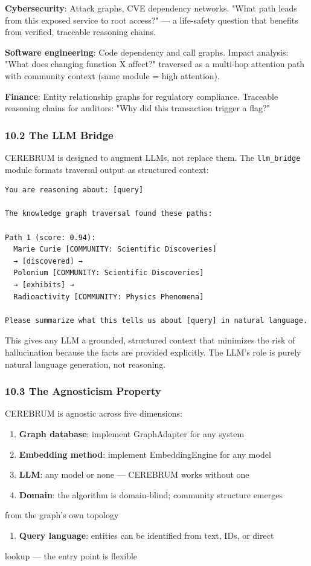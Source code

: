 \documentclass[10pt,journal,compsoc]{IEEEtran}
\begin{document}
\textbf{Cybers\-ecurity}: Attack graphs, CVE dependency networks. "What path leads
from this exposed service to root access?" — a life-safety question that
benefits from verified, traceable reasoning chains.

\textbf{Software engineering}: Code dependency and call graphs. Impact analysis:
"What does changing function X affect?" traversed as a multi-hop attention
path with community context (same module = high attention).

\textbf{Finance}: Entity relat\-ionship graphs for regulatory compliance. Traceable
reasoning chains for auditors: "Why did this transaction trigger a flag?"

\subsubsection{10.2 The LLM Bridge}

CEREBRUM is designed to augment LLMs, not replace them. The \texttt{llm\_bridge}
module formats traversal output as structured context:

\begin{lstlisting}
You are reasoning about: [query]

The knowledge graph traversal found these paths:

Path 1 (score: 0.94):
  Marie Curie [COMMUNITY: Scientific Discoveries]
  → [discovered] →
  Polonium [COMMUNITY: Scientific Discoveries]
  → [exhibits] →
  Radioactivity [COMMUNITY: Physics Phenomena]

Please summarize what this tells us about [query] in natural language.
\end{lstlisting}

This gives any LLM a grounded, structured context that minimizes the risk of
hallu\-cination because the facts are provided explicitly. The LLM's role is
purely natural language generation, not reasoning.

\subsubsection{10.3 The Agnosticism Property}

CEREBRUM is agnostic across five dimensions:

\begin{enumerate}
\item \textbf{Graph database}: implement GraphAdapter for any system
\item \textbf{Embedding method}: implement EmbeddingEngine for any model
\item \textbf{LLM}: any model or none — CEREBRUM works without one
\item \textbf{Domain}: the algorithm is domain-blind; community structure emerges
\end{enumerate}
   from the graph's own topology
\begin{enumerate}
\item \textbf{Query language}: entities can be identified from text, IDs, or direct
\end{enumerate}
   lookup — the entry point is flexible
\end{document}
